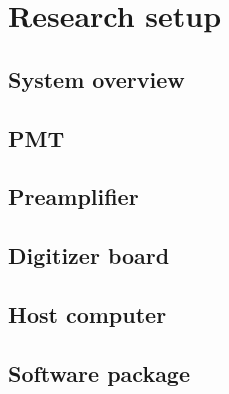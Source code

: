\section{Research setup}
\subsection{System overview}
\subsection{PMT}
\subsection{Preamplifier}
\subsection{Digitizer board}
\subsection{Host computer}
\subsection{Software package}
